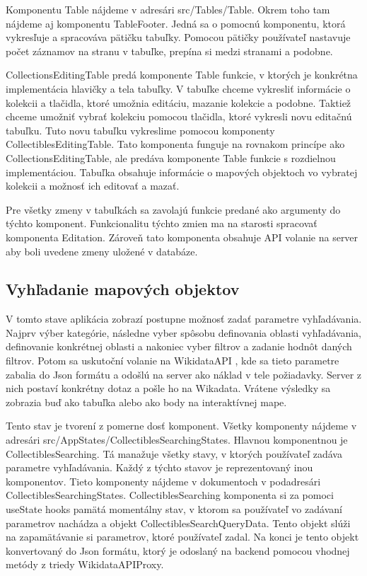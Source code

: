 Komponentu Table nájdeme v adresári src/Tables/Table. Okrem toho tam nájdeme aj komponentu TableFooter. Jedná sa o pomocnú komponentu, ktorá vykresľuje a spracováva pätičku tabuľky. 
Pomocou pätičky používateľ nastavuje počet záznamov na stranu v tabuľke, prepína si medzi stranami a podobne. 

CollectionsEditingTable  predá komponente Table funkcie, v ktorých je konkrétna implementácia hlavičky a tela tabuľky. V tabuľke chceme vykresliť informácie o kolekcii a tlačidla, ktoré 
umožnia editáciu, mazanie kolekcie a podobne. Taktiež chceme umožniť vybrať kolekciu pomocou tlačidla, ktoré  vykresli novu editačnú tabuľku. Tuto novu tabuľku vykreslime pomocou komponenty 
CollectiblesEditingTable. Tato komponenta funguje na rovnakom princípe ako CollectionsEditingTable, ale predáva komponente Table funkcie s rozdielnou implementáciou. 
Tabuľka obsahuje informácie o mapových objektoch vo vybratej kolekcii a možnosť ich editovať a mazať. 

Pre všetky zmeny v tabuľkách sa zavolajú funkcie predané ako argumenty do týchto komponent. Funkcionalitu týchto zmien ma na starosti spracovať komponenta Editation. 
Zároveň tato komponenta obsahuje  API volanie 
na server aby boli uvedene zmeny uložené v databáze. 

\subsection*{Vyhľadanie mapových objektov }

V tomto stave aplikácia zobrazí postupne možnosť zadať parametre vyhľadávania. Najprv výber kategórie, následne vyber spôsobu definovania oblasti vyhľadávania, definovanie konkrétnej 
oblasti a nakoniec vyber filtrov a zadanie hodnôt daných filtrov. Potom sa uskutoční volanie na WikidataAPI , kde sa tieto parametre zabalia do Json formátu a odošlú na server ako náklad v tele požiadavky. Server z nich postaví konkrétny dotaz a pošle ho 
na Wikadata. Vrátene výsledky sa zobrazia buď ako tabuľka  alebo ako body na interaktívnej mape. 

Tento stav je tvorení z pomerne dosť komponent. Všetky komponenty nájdeme v adresári src/AppStates/CollectiblesSearchingStates. 
Hlavnou komponentnou je CollectiblesSearching. Tá manažuje všetky stavy, v ktorých používateľ zadáva parametre vyhľadávania. Každý z týchto stavov je reprezentovaný inou komponentov. Tieto komponenty nájdeme 
v dokumentoch v podadresári CollectiblesSearchingStates. CollectiblesSearching komponenta si za pomoci useState hooks pamätá momentálny stav, v ktorom sa používateľ vo zadávaní parametrov nachádza a objekt CollectiblesSearchQueryData. 
Tento objekt slúži na zapamätávanie si parametrov, ktoré používateľ zadal. Na konci je tento objekt konvertovaný do Json formátu, ktorý je odoslaný na backend pomocou vhodnej metódy z triedy WikidataAPIProxy. 

